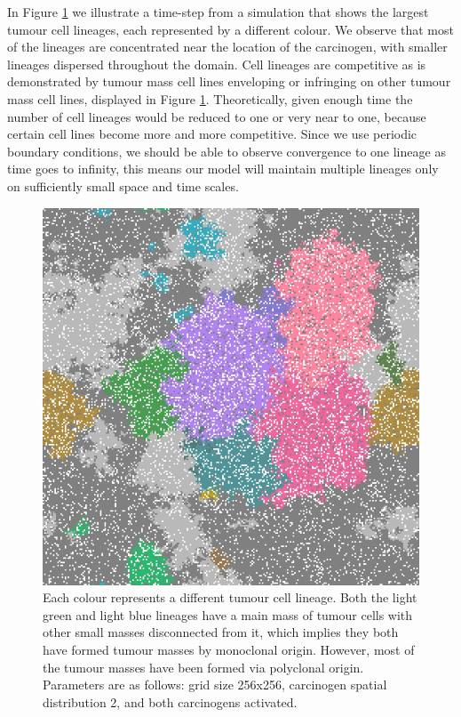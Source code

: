 \documentclass[\main/thesis.tex]{subfiles}
\begin{document}
In Figure \ref{fig:MonoclonalvsPolyclonal_TumourLineages} we illustrate a time-step from a simulation that shows the largest tumour cell lineages, each represented by a different colour. We observe that most of the lineages are concentrated near the location of the carcinogen, with smaller lineages dispersed throughout the domain. Cell lineages are competitive as is demonstrated by tumour mass cell lines enveloping or infringing on other tumour mass cell lines, displayed in Figure \ref{fig:MonoclonalvsPolyclonal_TumourLineages}. Theoretically, given enough time the number of cell lineages would be reduced to one or very near to one, because certain cell lines become more and more competitive. Since we use periodic boundary conditions, we should be able to observe convergence to one lineage as time goes to infinity, this means our model will maintain multiple lineages only on sufficiently small space and time scales.
\begin{figure}[H]
    \centering
    \includegraphics[width=\textwidth]{images/6_MonoclonalvsPolyclonal/Fig1/TumourLineages.jpeg}
    \caption{Each colour represents a different tumour cell lineage. Both the light green and light blue lineages have a main mass of tumour cells with other small masses disconnected from it, which implies they both have formed tumour masses by monoclonal origin. However, most of the tumour masses have been formed via polyclonal origin. Parameters are as follows: grid size 256x256, carcinogen spatial distribution 2, and both carcinogens activated.}
    \label{fig:MonoclonalvsPolyclonal_TumourLineages}
\end{figure}
\end{document}
